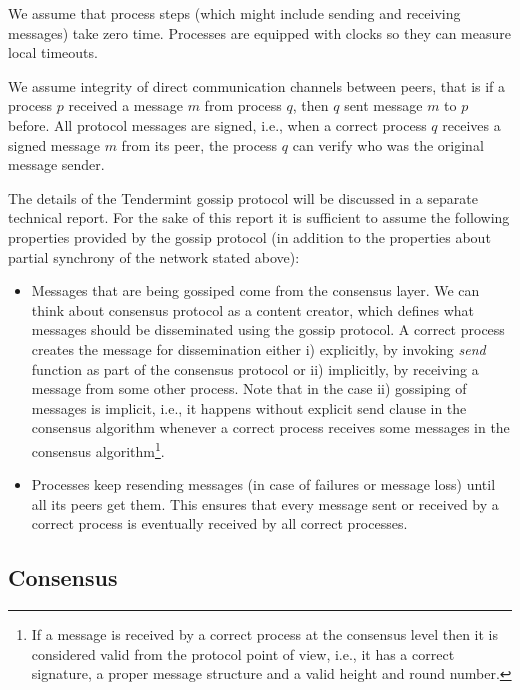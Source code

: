 We assume that process steps (which might include sending and receiving messages) take zero time.
Processes are equipped with clocks so they can measure local timeouts.

We assume integrity of direct communication channels between peers, that is if a process $p$ received a message $m$ from process $q$, then $q$ sent message $m$ to $p$ before. All protocol messages are signed, i.e., when a correct process $q$ receives a signed message $m$ from its peer, the process $q$ can verify who was the original message sender.

The details of the Tendermint gossip protocol will be discussed in a separate technical report. For the sake of this report it is sufficient to assume the following properties provided by the gossip protocol (in addition to the properties about partial synchrony of the network stated above):

\begin{itemize}
	\item Messages that are being gossiped come from the consensus layer. We can think about consensus protocol as a content creator, which defines what messages should be disseminated using the gossip protocol. A correct process creates the message for dissemination either i) explicitly, by invoking \emph{send} function as part of the consensus protocol or ii) implicitly, by receiving a message from some other process. Note that in the case ii) gossiping of messages is implicit, i.e., it happens without explicit send clause in the consensus algorithm whenever a correct process receives some messages in the consensus algorithm\footnote{If a message is received by a correct process at the consensus level then it is considered valid from the protocol point of view, i.e., it has a correct signature, a proper message structure and a valid height and round number.}. 
    \item Processes keep resending messages (in case of failures or message loss) until all its peers get them. This ensures that every message sent or received by a correct process is eventually received by all correct processes. 
\end{itemize}


 \subsection{Consensus}
 \label{sec:consensus}

 \newcommand{\propose}{\mathsf{propose}}
 \newcommand{\decide}{\mathsf{decide}}

